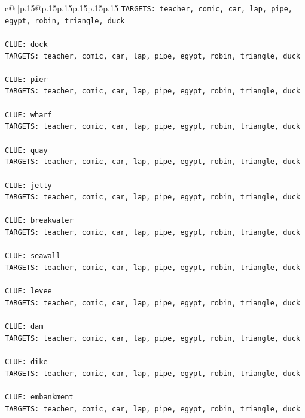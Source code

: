 \documentclass{article}
\begin{document}
{\begin{supertabular}{c@{$\;$}|p{.15\linewidth}@{}p{.15\linewidth}p{.15\linewidth}p{.15\linewidth}p{.15\linewidth}p{.15\linewidth}}
{{{\texttt{TARGETS: teacher, comic, car, lap, pipe, egypt, robin, triangle, duck} \\
\\ 
\texttt{CLUE: dock} \\
\texttt{TARGETS: teacher, comic, car, lap, pipe, egypt, robin, triangle, duck} \\
\\ 
\texttt{CLUE: pier} \\
\texttt{TARGETS: teacher, comic, car, lap, pipe, egypt, robin, triangle, duck} \\
\\ 
\texttt{CLUE: wharf} \\
\texttt{TARGETS: teacher, comic, car, lap, pipe, egypt, robin, triangle, duck} \\
\\ 
\texttt{CLUE: quay} \\
\texttt{TARGETS: teacher, comic, car, lap, pipe, egypt, robin, triangle, duck} \\
\\ 
\texttt{CLUE: jetty} \\
\texttt{TARGETS: teacher, comic, car, lap, pipe, egypt, robin, triangle, duck} \\
\\ 
\texttt{CLUE: breakwater} \\
\texttt{TARGETS: teacher, comic, car, lap, pipe, egypt, robin, triangle, duck} \\
\\ 
\texttt{CLUE: seawall} \\
\texttt{TARGETS: teacher, comic, car, lap, pipe, egypt, robin, triangle, duck} \\
\\ 
\texttt{CLUE: levee} \\
\texttt{TARGETS: teacher, comic, car, lap, pipe, egypt, robin, triangle, duck} \\
\\ 
\texttt{CLUE: dam} \\
\texttt{TARGETS: teacher, comic, car, lap, pipe, egypt, robin, triangle, duck} \\
\\ 
\texttt{CLUE: dike} \\
\texttt{TARGETS: teacher, comic, car, lap, pipe, egypt, robin, triangle, duck} \\
\\ 
\texttt{CLUE: embankment} \\
\texttt{TARGETS: teacher, comic, car, lap, pipe, egypt, robin, triangle, duck} \\
}}}
\end{supertabular}}
\end{document}
